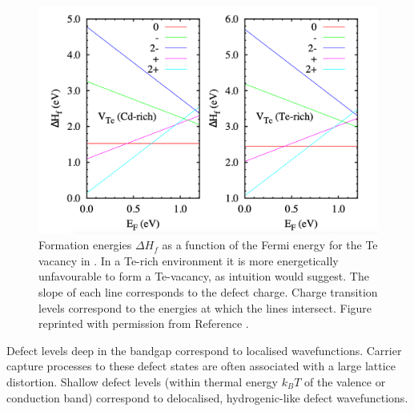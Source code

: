 \begin{figure}[h]
\centering
  \includegraphics[width=0.8\columnwidth]{figures/ch3/defectenergetics.png}
  \caption[Formation energies of the Te vacancy in CdTe]{Formation energies $\Delta H_f$ as a function of the Fermi energy for the Te vacancy in . In a Te-rich environment it is more energetically unfavourable to form a Te-vacancy, as intuition would suggest. The slope of each line corresponds to the defect charge. Charge transition levels correspond to the energies at which the lines intersect. Figure reprinted with permission from Reference \cite{Menendez2016}.}
  \label{CdTeformation}
\end{figure}%

Defect levels deep in the bandgap correspond to localised wavefunctions. Carrier capture processes to these defect states are often associated with a large lattice distortion. Shallow defect levels (within thermal energy $k_BT$ of the valence or conduction band) correspond to delocalised, hydrogenic-like defect wavefunctions. 



